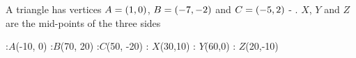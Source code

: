 \EXPR[0]
\EXPR[0]
\EXPR[0]
\EXPR[0]
\EXPR[0]
\EXPR[0]

\EXPR[0]{\mab}{-(\vbthree - \vbone)/(\vbfour - \vbtwo)}
\EXPR[2]{\mbc}{-(\vbfive - \vbthree)/(\vbsix - \vbfour) }
\EXPR[0]{\mca}{-(\vbone - \vbfive)/(\vbtwo - \vbsix)} 
%
\EXPR[0]{\cone}{\yone - (\mab * \xone)}
\EXPR[0]{\ctwo}{\ytwo - (\mbc * \xtwo)}
\EXPR[0]{\cthree}{\ythree - (\mca * \xthree)}

\question A triangle has vertices $A = (1, 0)$, $B = (-7, -2)$ and 
$C = (-5, 2)$ - \asif. $X$, $Y$ and $Z$ are the mid-points of the three sides 


  \begin{marginfigure}[-47pt]
      :$A$(-10, 0)
      :$B$(70, 20)
      :$C$(50, -20)
      : $X$(30,10)
      : $Y$(60,0)
      : $Z$(20,-10)
    \figdrawbegin{}
      \figdrawline [10, 20]
      \figdrawline [20, 30]
      \figdrawline [30, 10]
    \figdrawend
    \centerline{\box\figBoxA}
  \end{marginfigure}

